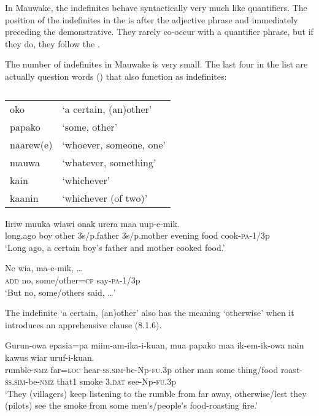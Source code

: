 In Mauwake, the indefinites behave syntactically very much like quantifiers. The position of the indefinites in the  is after the adjective phrase and immediately preceding the demonstrative. They rarely co-occur with a quantifier phrase, but if they do, they follow the .

The number of indefinites in Mauwake is very small. The last four in the list are actually question words () that also function as indefinites:

\begin{table}
\caption{}
\label{} 
\begin{tabular}{ll}
oko &`a certain, (an)other'\\
papako &`some, other'\\
naarew(e) &`whoever, someone, one'\\
mauwa &`whatever, something'\\
kain &`whichever'\\
kaanin &`whichever (of two)'\\
\end{tabular}
\end{table}


\ea%
\label{ex:x641}
\gll Iiriw muuka  wiawi onak urera maa uup-e-mik.\\
long.ago boy other 3s/p.father 3s/p.mother evening food cook-\textsc{pa}-1/3p\\
\glt`Long ago, a certain boy's father and mother cooked food.'
\z

\ea%
\label{ex:x642}
\gll Ne wia,  ma-e-mik, {\dots} \\
\textsc{add} no, some/other=\textsc{cf} say-\textsc{pa}-1/3p\\
\glt`But no, some/others said, {\dots}'
\z

The indefinite  `a certain, (an)other' also has the meaning `otherwise' when it introduces an apprehensive clause (8.1.6).

\ea%
\label{ex:x741}
\gll Gurun-owa epasia=pa miim-am-ika-i-kuan,  mua papako maa ik-em-ik-owa nain kawus wiar uruf-i-kuan.\\
rumble-\textsc{nmz} far=\textsc{loc} hear-\textsc{ss}.\textsc{sim}-be-Np-\textsc{fu}.3p other man some thing/food roast-\textsc{ss}.\textsc{sim}-be-\textsc{nmz} that1 smoke 3.\textsc{dat} see-Np-\textsc{fu}.3p\\
\glt`They (villagers) keep listening to the rumble from far away, otherwise/lest they (pilots) see the smoke from some men's/people's food-roasting fire.'
\z


